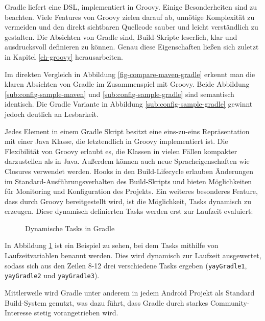 Gradle liefert eine DSL, implementiert in Groovy. 
Einige Besonderheiten sind zu beachten.
Viele Features von Groovy zielen darauf ab, unnötige Komplexität zu vermeiden und den direkt sichtbaren Quellcode sauber und leicht verständlich zu gestalten.
Die Absichten von Gradle sind, Build-Skripte leserlich, klar und ausdrucksvoll definieren zu können. Genau diese Eigenschaften ließen sich zuletzt in Kapitel \ref{ch-groovy} herausarbeiten.

Im direkten Vergleich in Abbildung \ref{fig-compare-maven-gradle} erkennt man die klaren Absichten von Gradle im Zusammenspiel mit Groovy. 
Beide Abbildung \ref{sub:config-sample-maven} und \ref{sub:config-sample-gradle} sind semantisch identisch. 
Die Gradle Variante in Abbildung \ref{sub:config-sample-gradle} gewinnt jedoch deutlich an Lesbarkeit.

Jedes Element in einem Gradle Skript besitzt eine eins-zu-eins Repräsentation mit einer Java Klasse, die letztendlich in Groovy implementiert ist. 
Die Flexibilität von Groovy erlaubt es, die Klassen in vielen Fällen kompakter darzustellen als in Java.
Außerdem können auch neue Spracheigenschaften wie Closures verwendet werden.
Hooks in den Build-Lifecycle erlauben Änderungen im Standard-Ausführungsverhalten des Build-Skripts und bieten Möglichkeiten für Monitoring und Konfiguration des Projekts.
Ein weiteres besonderes Feature, dass durch Groovy bereitgestellt wird, ist die Möglichkeit, Tasks dynamisch zu erzeugen. 
Diese dynamisch definierten Tasks werden erst zur Laufzeit evaluiert:


\begin{figure} [hbt!]
	
	\caption{Dynamische Tasks in Gradle}
	\label{fig:dyn-tasks}
\end{figure}

In Abbildung \ref{fig:dyn-tasks} ist ein Beispiel zu sehen, bei dem Tasks mithilfe von Laufzeitvariablen benannt werden. Dies wird dynamisch zur Laufzeit ausgewertet, sodass sich aus den Zeilen 8-12 drei verschiedene Tasks ergeben (\texttt{yayGradle1}, \texttt{yayGradle2} und \texttt{yayGradle3}).

Mittlerweile wird Gradle unter anderem in jedem Android Projekt als Standard Build-System genutzt, was dazu führt, dass Gradle durch starkes Community-Interesse stetig vorangetrieben wird. 
